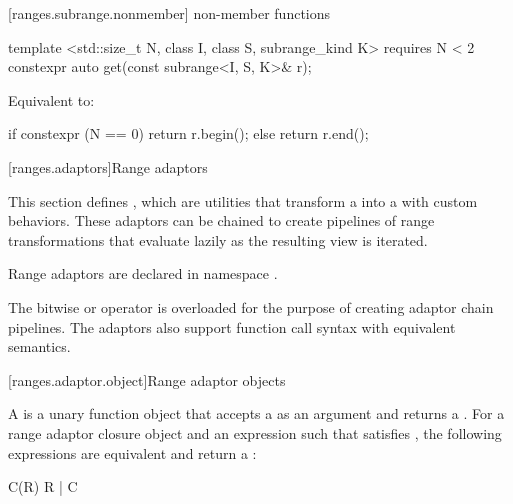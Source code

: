 [ranges.subrange.nonmember]{ non-member functions}

%
\begin{itemdecl}
template <std::size_t N, class I, class S, subrange_kind K>
  requires N < 2
constexpr auto get(const subrange<I, S, K>& r);
\end{itemdecl}

\begin{itemdescr}
\pnum
\effects Equivalent to:
\begin{codeblock}
if constexpr (N == 0)
  return r.begin();
else
  return r.end();
\end{codeblock}
\end{itemdescr}

[ranges.adaptors]{Range adaptors}

\pnum
This section defines , which are utilities that transform a 
into a  with custom behaviors. These adaptors can be chained to create pipelines of
range transformations that evaluate lazily as the resulting view is iterated.

\pnum
Range adaptors are declared in namespace .

\pnum
The bitwise or operator is overloaded for the purpose of creating adaptor chain pipelines. The
adaptors also support function call syntax with equivalent semantics.

\pnum
\enterexample
{}
\exitexample

[ranges.adaptor.object]{Range adaptor objects}

\pnum
A  is a unary function object that accepts
a  as an argument and returns a . For a range
adaptor closure object  and an expression  such that
 satisfies , the following expressions
are equivalent and return a :

\begin{codeblock}
C(R)
R | C
\end{codeblock}

